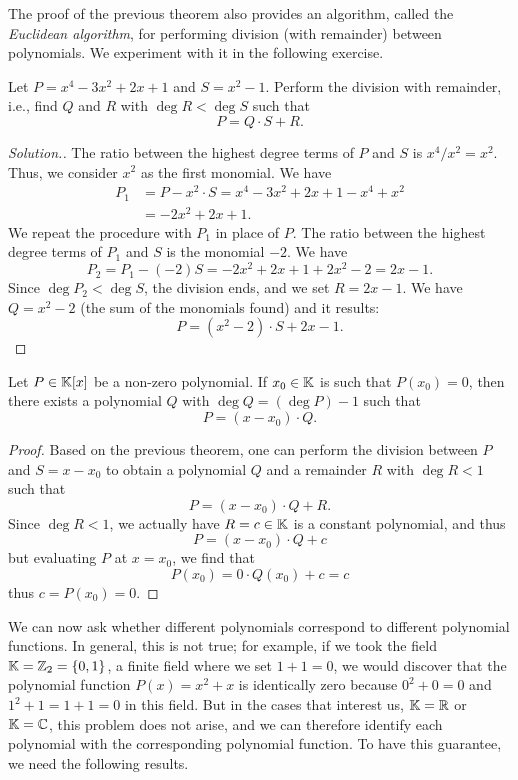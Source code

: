   The proof of the previous theorem also provides an
  algorithm, called the \emph{Euclidean algorithm},
  for performing division (with remainder) between polynomials.
  We experiment with it in the following exercise.
  
  \begin{exercise}
  Let $P = x^4-3 x^2 + 2x + 1$ and $S = x^2-1$.
  Perform the division with remainder, i.e.,
  find $Q$ and $R$ with $\deg R < \deg S$ such that
  \[
  P = Q \cdot S + R.
  \]
  \end{exercise}
  \begin{proof}[Solution.]
  The ratio between the highest degree terms of
  $P$ and $S$ is $x^4/x^2 = x^2$.
  Thus, we consider $x^2$ as the first monomial.
  We have
  \begin{align*}
    P_1
    &= P - x^2 \cdot S
    = x^4-3x^2+2x+1 - x^4+x^2 \\
    &= -2x^2+2x+1.
  \end{align*}
  We repeat the procedure with $P_1$ in place of $P$.
  The ratio between the highest degree terms of $P_1$ and $S$
  is the monomial $-2$. We have
  \[
    P_2 = P_1 - (-2) S = -2x^2 + 2x + 1 + 2x^2 - 2 = 2x -1.
  \]
  Since $\deg P_2 < \deg S$, the division ends, and
  we set $R = 2x-1$.
  We have $Q = x^2 - 2$ (the sum of the monomials found)
  and it results:
  \[
    P = (x^2 - 2)\cdot S + 2x -1.
  \]
  \end{proof}
  
  \begin{theorem}[Ruffini]
  \label{th:Ruffini}%
  Let $P\in {\mathbb K}[x]$ be a non-zero polynomial.
  If $x_0 \in {\mathbb K}$ is such that $P(x_0)=0$,
  then there exists a polynomial $Q$ with $\deg Q = (\deg P) - 1$
  such that
  \[
    P = (x-x_0)\cdot Q.
  \]
  \end{theorem}
  \begin{proof}
  Based on the previous theorem, one can perform the division between
  $P$ and $S = x - x_0$ to obtain a polynomial $Q$ and a remainder
  $R$ with $\deg R < 1$ such that
  \[
    P = (x-x_0)\cdot Q + R.
  \]
  Since $\deg R < 1$, we actually have $R=c\in {\mathbb K}$
  is a constant polynomial, and thus
  \[
    P = (x-x_0) \cdot Q + c
  \]
  but evaluating $P$ at $x=x_0$, we find that
  \[
   P(x_0) = 0\cdot Q(x_0) + c = c
  \]
  thus $c=P(x_0) = 0$.
  \end{proof}
  
  We can now ask whether different polynomials correspond
  to different polynomial functions.
  In general, this is not true; for example, if we took
  the field ${\mathbb K}={\mathbb Z}_2 = {\left\{ 0,1 \right\}}$, a finite field
  where we set $1+1=0$, we would discover that the polynomial function
  $P(x) = x^2+x$ is identically zero because $0^2+0=0$
  and $1^2+1=1+1=0$ in this field.
  But in the cases that interest us, ${\mathbb K}={\mathbb R}$ or ${\mathbb K}={\mathbb C}$,
  this problem does not arise, and we can therefore identify
  each polynomial with the corresponding polynomial function.
  To have this guarantee, we need the following results.
  
